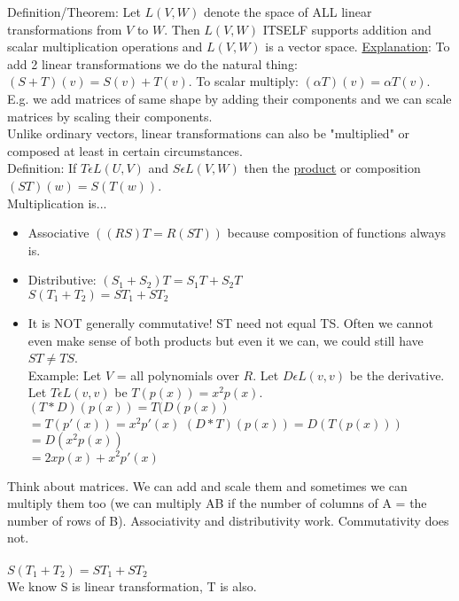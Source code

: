 \documentclass{article}
\begin{document}
Definition/Theorem: Let $L(V,W)$ denote the space of ALL linear transformations from $V$ to $W$. Then $L(V,W)$ ITSELF supports addition and scalar multiplication operations and $L(V,W)$ is a vector space. \underline{Explanation}: To add 2 linear transformations we do the natural thing: $(S + T)(v) = S(v) + T(v)$. To scalar multiply: $(\alpha T)(v) = \alpha T(v)$. E.g. we add matrices of same shape by adding their components and we can scale matrices by scaling their components. \\
Unlike ordinary vectors, linear transformations can also be "multiplied" or composed at least in certain circumstances. \\
Definition: If $T \epsilon L(U,V)$ and $S \epsilon L(V,W)$ then the \underline{product} or composition $(ST)(w) = S(T(w))$. \\
Multiplication is...\begin{itemize}
\item Associative $((RS)T = R(ST))$ because composition of functions always is.
\item Distributive: $(S_1 + S_2)T = S_1T + S_2T$\\
$S(T_1 + T_2) = ST_1 + ST_2$
\item It is NOT generally commutative! ST need not equal TS. Often we cannot even make sense of both products but even it we can, we could still have $ST \neq TS$. \\
Example: Let $V$ = all polynomials over $R$. Let $D \epsilon L(v, v)$ be the derivative. Let $T \epsilon L(v, v)$ be $T(p(x)) = x^2p(x)$. \\
$(T*D)(p(x)) = T(D(p(x))$\\
$= T(p'(x)) = x^2p'(x)$
$(D*T)(p(x)) = D(T(p(x)))$\\
$=D(x^2p(x))$\\
$=2xp(x) + x^2p'(x)$
\end{itemize}
Think about matrices. We can add and scale them and sometimes we can multiply them too (we can multiply AB if the number of columns of A = the number of rows of B). Associativity and distributivity work. Commutativity does not. \\\\
$S(T_1 + T_2) = ST_1 + ST_2$\\
We know S is linear transformation, T is also. 
\end{document}
